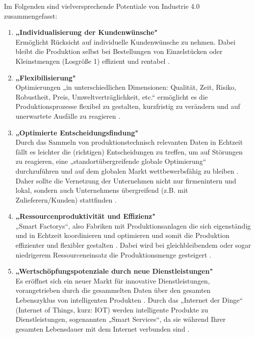\newline
Im Folgenden sind vielversprechende Potentiale von Industrie 4.0 zusammengefasst:
\begin{enumerate}
	\item \textbf{„Individualisierung der Kundenwünsche"} \cite[S.19]{12} \\
	Ermöglicht Rücksicht auf individuelle Kundenwünsche zu nehmen. Dabei bleibt die 
	Produktion selbst bei Bestellungen von Einzelstücken oder Kleinstmengen (Losgröße 1) 
	effizient und rentabel \cite[S.19]{12}.
	\item \textbf{„Flexibilisierung"} \cite[S.20]{12} \\
	Optimierungen „in unterschiedlichen Dimensionen: Qualität, Zeit, Risiko, Robustheit, Preis,
	Umweltverträglichkeit, etc.“ ermöglicht es die Produktionsprozesse flexibel zu gestalten,
	kurzfristig zu verändern und auf unerwartete Ausfälle zu reagieren \cite[S.20]{12}.
	\item \textbf{„Optimierte Entscheidungsfindung"} \cite[S.20]{12} \\
	Durch das Sammeln von produktionstechnisch relevanten Daten in Echtzeit fällt es leichter
	die (richtigen) Entscheidungen zu treffen, um auf Störungen zu reagieren, eine
	„standortübergreifende globale Optimierung“ durchzuführen und auf dem globalen Markt 
	wettbewerbsfähig zu bleiben \cite[S.20]{12}. Daher sollte die Vernetzung der 
	Unternehmen nicht nur firmenintern und lokal, sondern auch Unternehmens übergreifend 
	(z.B. mit Zulieferern/Kunden) stattfinden \cite{6}.
	\item \textbf{„Ressourcenproduktivität und Effizienz"} \cite[S.20]{12} \\
	„Smart Factorys“, also Fabriken mit Produktionsanlagen die sich eigenständig und in Echtzeit 
	koordinieren und optimieren und somit die Produktion effizienter und flexibler gestalten \cite{6}. Dabei wird bei gleichbleibendem oder sogar niedrigerem 
	Ressourceneinsatz die Produktionsmenge gesteigert \cite[S.20]{12}.
	\item \textbf{„Wertschöpfungspotenziale durch neue Dienstleistungen"} \cite[S.20]{12} \\
	Es eröffnet sich ein neuer Markt für innovative Dienstleistungen, vorangetrieben durch die
	gesammelten Daten über den gesamten Lebenszyklus von intelligenten Produkten 
	\cite[S.20]{12}. Durch das „Internet der Dinge“ (Internet of Things, kurz: IOT)
	werden intelligente Produkte zu Dienstleistungen, sogenannten „Smart Services“, da sie 
	während Ihrer gesamten Lebensdauer mit dem Internet verbunden sind \cite{6}.

\end{enumerate}
